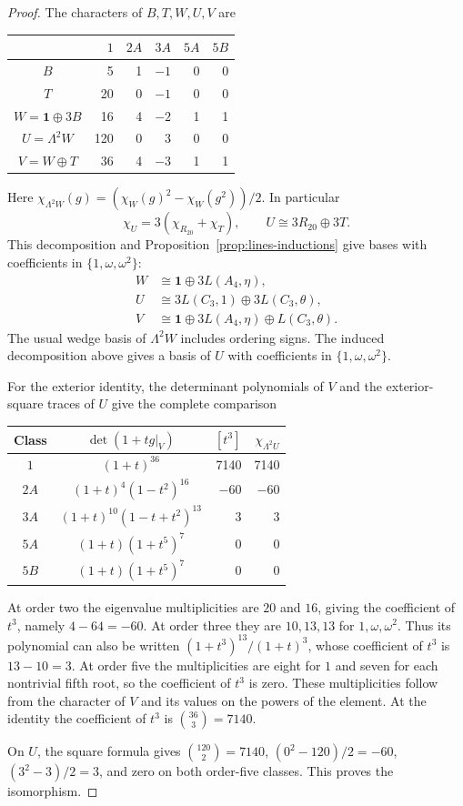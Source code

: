 \documentclass[11pt,a4paper]{article}
\begin{document}
\begin{proof}
The characters of $B,T,W,U,V$ are
\begin{center}\small
\begin{tabular}{c|rrrrr}
\toprule
& $1$&$2A$&$3A$&$5A$&$5B$\\\midrule
$B$&5&1&$-1$&0&0\\
$T$&20&0&$-1$&0&0\\
$W=\mathbf1\oplus3B$&16&4&$-2$&1&1\\
$U=\Lambda^2W$&120&0&3&0&0\\
$V=W\oplus T$&36&4&$-3$&1&1\\\bottomrule
\end{tabular}
\end{center}
Here $\chi_{\Lambda^2W}(g)
=(\chi_W(g)^2-\chi_W(g^2))/2$. In particular
\[
\chi_U=3(\chi_{R_{20}}+\chi_T),\qquad
U\cong3R_{20}\oplus3T.
\]
This decomposition and Proposition~\ref{prop:lines-inductions} give bases with coefficients in $\{1,\omega,\omega^2\}$:
\begin{align*}
W&\cong\mathbf1\oplus3L(A_4,\eta),\\
U&\cong3L(C_3,1)\oplus3L(C_3,\theta),\\
V&\cong\mathbf1\oplus3L(A_4,\eta)\oplus L(C_3,\theta).
\end{align*}
The usual wedge basis of $\Lambda^2W$ includes ordering signs. The induced decomposition above gives a basis of $U$ with coefficients in $\{1,\omega,\omega^2\}$.

\begin{samepage}
For the exterior identity, the determinant polynomials of $V$ and the
exterior-square traces of $U$ give the complete comparison
\begin{center}\small
\begin{tabular}{c|c|r|r}
\toprule
Class&$\det(1+tg|_V)$&$[t^3]$&$\chi_{\Lambda^2U}$\\\midrule
$1$&$(1+t)^{36}$&7140&7140\\
$2A$&$(1+t)^4(1-t^2)^{16}$&$-60$&$-60$\\
$3A$&$(1+t)^{10}(1-t+t^2)^{13}$&3&3\\
$5A$&$(1+t)(1+t^5)^7$&0&0\\
$5B$&$(1+t)(1+t^5)^7$&0&0\\\bottomrule
\end{tabular}
\end{center}
\end{samepage}
At order two the eigenvalue multiplicities are $20$ and $16$, giving
the coefficient of $t^3$, namely $4-64=-60$. At order three they are $10,13,13$
for $1,\omega,\omega^2$. Thus its polynomial can also be written
$(1+t^3)^{13}/(1+t)^3$, whose coefficient of $t^3$ is $13-10=3$.
At order five the multiplicities are eight for $1$ and seven for each
nontrivial fifth root, so the coefficient of $t^3$ is zero. These
multiplicities follow from the character of $V$ and its values on the
powers of the element. At the identity the coefficient of $t^3$ is
$\binom{36}{3}=7140$.

On $U$, the square formula gives
$\binom{120}{2}=7140$, $(0^2-120)/2=-60$, $(3^2-3)/2=3$, and
zero on both order-five classes. This proves the isomorphism.
\end{proof}
\end{document}
